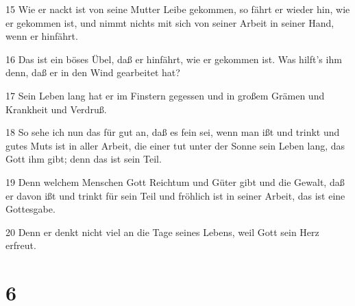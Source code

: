 \par 15 Wie er nackt ist von seine Mutter Leibe gekommen, so fährt er wieder hin, wie er gekommen ist, und nimmt nichts mit sich von seiner Arbeit in seiner Hand, wenn er hinfährt.
\par 16 Das ist ein böses Übel, daß er hinfährt, wie er gekommen ist. Was hilft's ihm denn, daß er in den Wind gearbeitet hat?
\par 17 Sein Leben lang hat er im Finstern gegessen und in großem Grämen und Krankheit und Verdruß.
\par 18 So sehe ich nun das für gut an, daß es fein sei, wenn man ißt und trinkt und gutes Muts ist in aller Arbeit, die einer tut unter der Sonne sein Leben lang, das Gott ihm gibt; denn das ist sein Teil.
\par 19 Denn welchem Menschen Gott Reichtum und Güter gibt und die Gewalt, daß er davon ißt und trinkt für sein Teil und fröhlich ist in seiner Arbeit, das ist eine Gottesgabe.
\par 20 Denn er denkt nicht viel an die Tage seines Lebens, weil Gott sein Herz erfreut.

\chapter{6}

